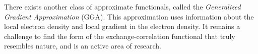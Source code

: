 \documentclass[]{article}
\begin{document}
There exists another class of approximate functionals, called the \textit{Generalized Gradient Approximation} (GGA). This approximation uses information about the local electron density and local gradient in the electron density. It remains a challenge to find the form of the exchange-correlation functional that truly resembles nature, and is an active area of research.



\newpage
\nocite{*}
\printbibliography[heading=bibintoc, title={References}]
\end{document}
